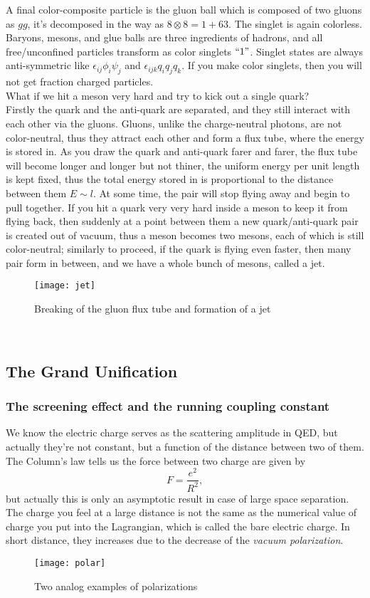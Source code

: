 \documentclass{article}
\newcommand{\subsec}{\subsection}
\newcommand{\be}{\begin{equation}}
\newcommand{\ee}{\end{equation}}
\renewcommand{\1}{\left}
\renewcommand{\2}{\right}
\newcommand{\ep}{\epsilon}
\begin{document}
A final color-composite particle is the gluon ball which is composed of two gluons as $gg$, it's decomposed in the way as $8\otimes 8=1+63$. The singlet is again colorless.\\

Baryons, mesons, and glue balls are three ingredients of hadrons, and all free/unconfined particles transform as color singlets $``1"$. Singlet states are always anti-symmetric like $\ep_{ij}\phi_i\psi_j$ and $\ep_{ijk}q_iq_jq_k$. If you make color singlets, then you will not get fraction charged particles.\\

What if we hit a meson very hard and try to kick out a single quark?\\
Firstly the quark and the anti-quark are separated, and they still interact with each other via the gluons. Gluons, unlike the charge-neutral photons, are not color-neutral, thus they attract each other and form a flux tube, where the energy is stored in. As you draw the quark and anti-quark farer and farer, the flux tube will become longer and longer but not thiner, the uniform energy per unit length is kept fixed, thus the total energy stored in is proportional to the distance between them $E\sim l$. At some time, the pair will stop flying away and begin to pull together. If you hit a quark very very hard inside a meson to keep it from flying back, then suddenly at a point between them a new quark/anti-quark pair is created out of vacuum, thus a meson becomes two mesons, each of which is still color-neutral; similarly to proceed, if the quark is flying even faster, then many pair form in between, and we have a whole bunch of mesons, called a jet.
\begin{figure}[h]
\centering
\texttt{[image: jet]}
\caption{Breaking of the gluon flux tube and formation of a jet}
\end{figure}\\

\subsec{The Grand Unification}
\subsubsection{The screening effect and the running coupling constant}
We know the electric charge serves as the scattering amplitude in QED, but actually they're not constant, but a function of the distance between two of them.\\
The Column's law tells us the force between two charge are given by
\be
F=\frac{e^2}{R^2},
\ee
but actually this is only an asymptotic result in case of large space separation. The charge you feel at a large distance is not the  same as the numerical value of charge you put into the Lagrangian, which is called the bare electric charge. In short distance, they increases due to the decrease of the \textit{vacuum polarization}. \\
\begin{figure}[h]
\centering
\texttt{[image: polar]}
\caption{Two analog examples of polarizations}
\end{figure}\\
\end{document}
